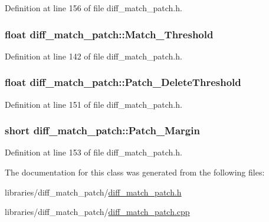 Definition at line 156 of file diff\_\-match\_\-patch.h.

\hypertarget{classdiff__match__patch_a4e7c966c7c2a930a578cf7ac8edc0e86}{
\subsubsection[{Match\_\-Threshold}]{\setlength{\rightskip}{0pt plus 5cm}float {\bf diff\_\-match\_\-patch::Match\_\-Threshold}}}
\label{classdiff__match__patch_a4e7c966c7c2a930a578cf7ac8edc0e86}


Definition at line 142 of file diff\_\-match\_\-patch.h.

\hypertarget{classdiff__match__patch_a45ecc3f1f3d865c8b1d1b2eb4f40ab33}{
\subsubsection[{Patch\_\-DeleteThreshold}]{\setlength{\rightskip}{0pt plus 5cm}float {\bf diff\_\-match\_\-patch::Patch\_\-DeleteThreshold}}}
\label{classdiff__match__patch_a45ecc3f1f3d865c8b1d1b2eb4f40ab33}


Definition at line 151 of file diff\_\-match\_\-patch.h.

\hypertarget{classdiff__match__patch_a798d3ee5eb9bf60ed679f50fa9a42d9b}{
\subsubsection[{Patch\_\-Margin}]{\setlength{\rightskip}{0pt plus 5cm}short {\bf diff\_\-match\_\-patch::Patch\_\-Margin}}}
\label{classdiff__match__patch_a798d3ee5eb9bf60ed679f50fa9a42d9b}


Definition at line 153 of file diff\_\-match\_\-patch.h.



The documentation for this class was generated from the following files:\begin{DoxyCompactItemize}
\item 
libraries/diff\_\-match\_\-patch/\hyperlink{diff__match__patch_8h}{diff\_\-match\_\-patch.h}\item 
libraries/diff\_\-match\_\-patch/\hyperlink{diff__match__patch_8cpp}{diff\_\-match\_\-patch.cpp}\end{DoxyCompactItemize}
